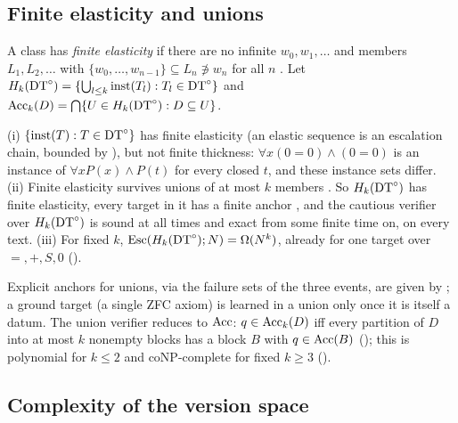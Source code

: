 \subsection{Finite elasticity and unions}\label{sec:single:unions}

A class has \emph{finite elasticity} if there are no infinite $w_0,w_1,\dots$ and members $L_1,L_2,\dots$ with $\{w_0,\dots,w_{n-1}\}\subseteq L_n\not\ni w_n$ for all $n$ \citep{wright1989identification,motoki1991correct}. Let $H_k(\mathrm{DT}^{\circ})=\{\bigcup_{l\le k}\mathrm{inst}(T_l):T_l\in\mathrm{DT}^{\circ}\}$ and $\mathrm{Acc}_k(D)=\bigcap\{U\in H_k(\mathrm{DT}^{\circ}):D\subseteq U\}$.

\begin{corollary}\label{cor:single:unions}
(i) $\{\mathrm{inst}(T):T\in\mathrm{DT}^{\circ}\}$ has finite elasticity (an elastic sequence is an escalation chain, bounded by ), but not finite thickness: $\forall x(0=0)\wedge(0=0)$ is an instance of $\forall xP(x)\wedge P(t)$ for every closed $t$, and these instance sets differ.
(ii) Finite elasticity survives unions of at most $k$ members \citep{wright1989identification,motoki1991correct}. So $H_k(\mathrm{DT}^{\circ})$ has finite elasticity, every target in it has a finite anchor \citep{claude2026whatfollows}, and the cautious verifier over $H_k(\mathrm{DT}^{\circ})$ is sound at all times and exact from some finite time on, on every text.
(iii) For fixed $k$, $\mathrm{Esc}(H_k(\mathrm{DT}^{\circ});N)=\Omega(N^k)$, already for one target over $=,+,S,0$ ().
\end{corollary}

Explicit anchors for unions, via the failure sets of the three events, are given by ; a ground target (a single ZFC axiom) is learned in a union only once it is itself a datum. The union verifier reduces to $\mathrm{Acc}$: $q\in\mathrm{Acc}_k(D)$ iff every partition of $D$ into at most $k$ nonempty blocks has a block $B$ with $q\in\mathrm{Acc}(B)$ (); this is polynomial for $k\le2$ and coNP-complete for fixed $k\ge3$ ().

\subsection{Complexity of the version space}\label{sec:single:complexity}

